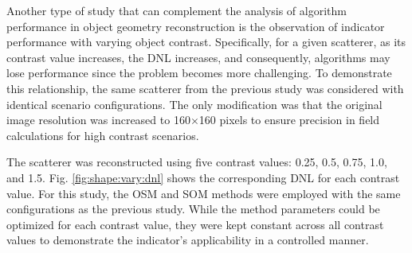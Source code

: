 \documentclass{IEEEtran}
\begin{document}
                Another type of study that can complement the analysis of algorithm performance in object geometry reconstruction is the observation of indicator performance with varying object contrast. Specifically, for a given scatterer, as its contrast value increases, the DNL increases, and consequently, algorithms may lose performance since the problem becomes more challenging. To demonstrate this relationship, the same scatterer from the previous study was considered with identical scenario configurations. The only modification was that the original image resolution was increased to 160$\times$160 pixels to ensure precision in field calculations for high contrast scenarios. 

                The scatterer was reconstructed using five contrast values: 0.25, 0.5, 0.75, 1.0, and 1.5. Fig. \ref{fig:shape:vary:dnl} shows the corresponding DNL for each contrast value. For this study, the OSM and SOM methods were employed with the same configurations as the previous study. While the method parameters could be optimized for each contrast value, they were kept constant across all contrast values to demonstrate the indicator's applicability in a controlled manner.
\end{document}
